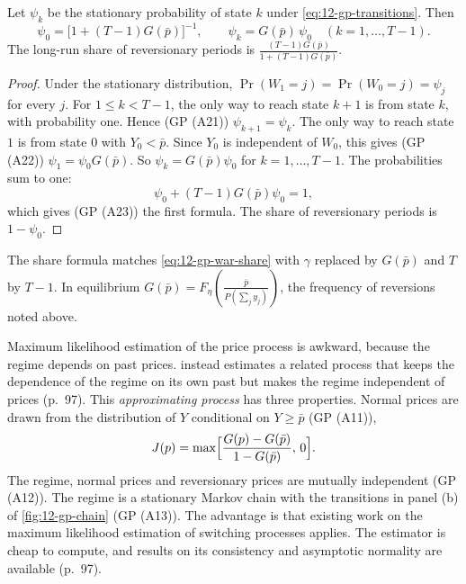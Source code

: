\begin{proposition}\label{prop:12-gp-stationary}
Let $\psi_k$ be the stationary probability of state $k$ under \eqref{eq:12-gp-transitions}. Then
\begin{equation}\label{eq:12-gp-stationary}
\psi_0 = \bigl[1 + (T - 1)G(\bar p)\bigr]^{-1},
\qquad
\psi_k = G(\bar p)\,\psi_0 \quad (k = 1, \dots, T - 1).
\end{equation}
The long-run share of reversionary periods is $\frac{(T - 1)G(\bar p)}{1 + (T - 1)G(\bar p)}$.
\end{proposition}

\begin{proof}
Under the stationary distribution, $\Pr(W_1 = j) = \Pr(W_0 = j) = \psi_j$ for every $j$. For $1 \le k < T - 1$, the
only way to reach state $k + 1$ is from state $k$, with probability one. Hence (GP (A21))
$\psi_{k+1} = \psi_k$. The only way to reach state $1$ is from state $0$ with $Y_0 < \bar p$. Since $Y_0$ is
independent of $W_0$, this gives (GP (A22)) $\psi_1 = \psi_0 G(\bar p)$. So $\psi_k = G(\bar p)\psi_0$ for
$k = 1, \dots, T - 1$. The probabilities sum to one:
\begin{equation*}
\psi_0 + (T - 1)G(\bar p)\psi_0 = 1 ,
\end{equation*}
which gives (GP (A23)) the first formula. The share of reversionary periods is $1 - \psi_0$.
\end{proof}

The share formula matches \eqref{eq:12-gp-war-share} with $\gamma$ replaced by $G(\bar p)$ and $T$ by $T - 1$. In
equilibrium $G(\bar p) = F_\eta(\frac{\bar p}{P(\sum_j y_j)})$, the frequency of reversions noted above.

Maximum likelihood estimation of the price process is awkward, because the regime depends on past prices.
 instead estimates a related process that keeps the dependence of the regime on its own past but
makes the regime independent of prices (p.~97). This \emph{approximating process} has three properties. Normal
prices are drawn from the distribution of $Y$ conditional on $Y \ge \bar p$ (GP (A11)),
\begin{equation*}
J(p) = \max\Bigl[\frac{G(p) - G(\bar p)}{1 - G(\bar p)},\, 0\Bigr].
\end{equation*}
The regime, normal prices and reversionary prices are mutually independent (GP (A12)). The regime is a stationary
Markov chain with the transitions in panel (b) of \cref{fig:12-gp-chain} (GP (A13)). The advantage is that existing
work on the maximum likelihood estimation of switching processes applies. The estimator is cheap to compute, and
results on its consistency and asymptotic normality are available (p.~97).

